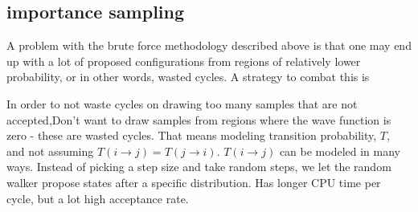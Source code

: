 \documentclass[%
oneside,                 %
final,                   %
10pt]{article}
\begin{document}
\begin{center}\end{center}
\subsection{importance sampling} \label{importance_sampling}
A problem with the brute force methodology described above is that one may end up with a lot of proposed configurations from regions of relatively lower probability, or in other words, wasted cycles. A strategy to combat this is 

In order to not waste cycles on drawing too many samples that are not accepted,Don't want to draw samples from regions where the wave function is zero - these are wasted cycles.
That means modeling transition probability, $T$, and not assuming $T(i\rightarrow j)=T(j\rightarrow i)$.
$T(i\rightarrow j)$ can be modeled in many ways. Instead of picking a step size and take random steps, we let the random walker propose states after a specific distribution. Has longer CPU time per cycle, but a lot high acceptance rate. 
\end{document}
